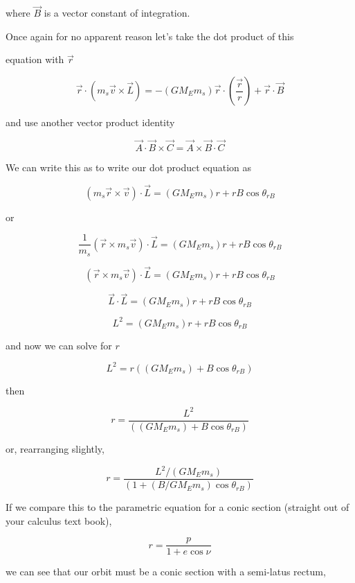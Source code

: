 where $\overrightarrow{B}$ is a vector constant of integration.


Once again for no apparent reason let's take the dot product of this

equation with $\overrightarrow{r}$%

$$\overrightarrow{r}\cdot \left( m_{s}\overrightarrow{v}\times \overrightarrow{L}\right) =-\left( GM_{E}m_{s}\right) \overrightarrow{r}\cdot \left( \frac{\overrightarrow{r}}{r}\right) +\overrightarrow{r}\cdot \overrightarrow{B} 
$$

and use another vector product identity%

$$\overrightarrow{A}\cdot \overrightarrow{B}\times \overrightarrow{C}=\overrightarrow{A}\times \overrightarrow{B}\cdot \overrightarrow{C} 
$$

We can write this as to write our dot product equation as 

$$\left( m_{s}\overrightarrow{r}\times \overrightarrow{v}\right) \cdot \overrightarrow{L}=\left( GM_{E}m_{s}\right) r+rB\cos \theta _{rB} 
$$

or

$$\frac{1}{m_{s}}\left( \overrightarrow{r}\times m_{s}\overrightarrow{v}\right) \cdot \overrightarrow{L}=\left( GM_{E}m_{s}\right) r+rB\cos \theta_{rB}
$$

$$\left( \overrightarrow{r}\times m_{s}\overrightarrow{v}\right) \cdot \overrightarrow{L}=\left( GM_{E}m_{s}\right) r+rB\cos \theta _{rB} 
$$

$$\overrightarrow{L}\cdot \overrightarrow{L}=\left( GM_{E}m_{s}\right)r+rB\cos \theta _{rB} 
$$

$$L^{2}=\left( GM_{E}m_{s}\right) r+rB\cos \theta _{rB} 
$$

and now we can solve for $r$%

$$L^{2}=r\left( \left( GM_{E}m_{s}\right) +B\cos \theta _{rB}\right) 
$$

then 

$$r=\frac{L^{2}}{\left( \left( GM_{E}m_{s}\right) +B\cos \theta _{rB}\right) } 
$$

or, rearranging slightly, 

$$r=\frac{L^{2}/\left( GM_{E}m_{s}\right) }{\left( 1+\left(B/GM_{E}m_{s}\right) \cos \theta _{rB}\right) } $$

If we compare this to the parametric equation for a conic section (straight out of your calculus text book), 

$$r=\frac{p}{1+e\cos \nu } $$

we can see that our orbit must be a conic section with a semi-latus rectum, 

